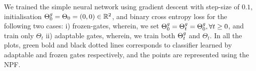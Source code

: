 We trained the simple neural network using gradient descent with step-size of $0.1$, initialisation ${\Theta}^g_0=\Theta_0=(0,0)\in\mathbb{R}^2$, and binary cross entropy loss for the following two cases: i) frozen-gates, wherein, we set ${\Theta}^g_0={\Theta}^g_t={\Theta}^g_0,\forall t\geq 0$, and train only $\Theta_t$ ii) adaptable gates, wherein, we train both ${\Theta}^g_t$ and $\Theta_t$. In all the plots, green bold and black dotted lines corresponds to classifier learned  by adaptable and frozen gates respectively, and the points are represented using the NPF.
\FloatBarrier
